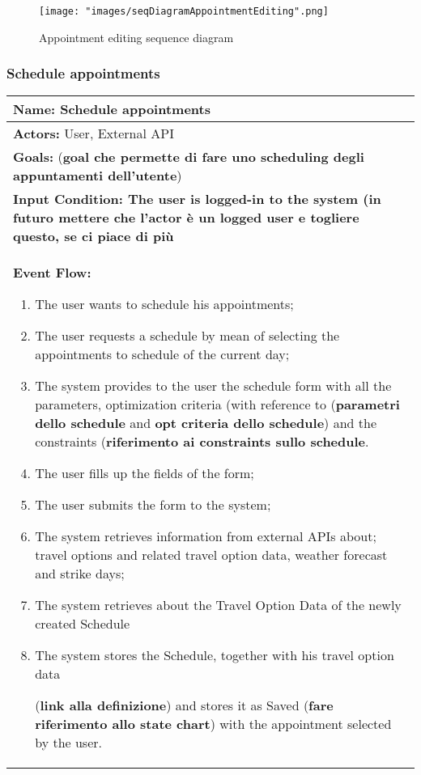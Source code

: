 \begin{figure}[H]
\begin{center}
\texttt{[image: "images/seqDiagramAppointmentEditing".png]}
\caption{Appointment editing sequence diagram}
\label{img:seqDiagrAppEditing00}
\end{center}
\end{figure}


\subsubsection{Schedule appointments}\label{usecase:scheduleappointments}
\begin{longtable}{|p{14cm}|} \hline
\textbf{Name:} Schedule appointments \\ \hline
\textbf{Actors:} User, External API \\ \hline
\textbf{Goals:} (\textbf{goal che permette di fare uno scheduling degli appuntamenti dell'utente})\\ \hline
\textbf{Input Condition: The user is logged-in to the system (\textbf{in futuro mettere che l'actor è un logged user e togliere questo, se ci piace di più}} \\ \hline

\textbf{Event Flow:}
\begin{enumerate}
\item The user wants to schedule his appointments;
\item The user requests a schedule by mean of selecting the appointments to schedule of the current day;
\item The system provides to the user the schedule form with all the parameters, optimization criteria (with reference to (\textbf{parametri dello schedule} and \textbf{opt criteria dello schedule}) and the constraints (\textbf{riferimento ai constraints sullo schedule}.
\item The user fills up the fields of the form;
\item The user submits the form to the system;
\item The system retrieves information from external APIs about; travel options and related travel option data, weather forecast and strike days;
\item The system retrieves about the Travel Option Data of the newly created Schedule
\item The system stores the Schedule, together with his travel option data

(\textbf{link alla definizione}) and stores it as Saved (\textbf{fare riferimento allo state chart}) with the appointment selected by the user.
\end{enumerate}	\\ \hline


\end{longtable}

